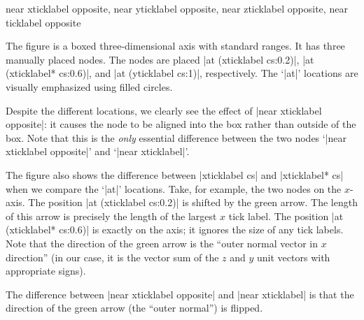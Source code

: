 \begin{anchorlist}{%
    near xticklabel opposite,
    near yticklabel opposite,
    near zticklabel opposite,
    near ticklabel opposite%
}
\begin{codeexample}[width=4cm]
\end{codeexample}
    The figure is a boxed three-dimensional axis with standard ranges. It has
    three manually placed nodes. The nodes are placed |at (xticklabel cs:0.2)|,
    |at (xticklabel* cs:0.6)|, and |at (yticklabel cs:1)|,  respectively. The
    `|at|' locations are visually emphasized using filled circles.

    Despite the different locations, we clearly see the effect of
    |near xticklabel opposite|: it causes the node to be aligned into the box
    rather than outside of the box. Note that this is the \emph{only} essential
    difference between the two nodes `|near xticklabel opposite|' and
    `|near xticklabel|'.

    The figure also shows the difference between |xticklabel cs| and
    |xticklabel* cs| when we compare the `|at|' locations. Take, for example,
    the two nodes on the $x$-axis. The position |at (xticklabel cs:0.2)| is
    shifted by the green arrow. The length of this arrow is precisely the
    length of the largest $x$ tick label. The position
    |at (xticklabel* cs:0.6)| is exactly on the axis; it ignores the size of
    any tick labels. Note that the direction of the green arrow is the ``outer
    normal vector in $x$ direction'' (in our case, it is the vector sum of the
    $z$ and $y$ unit vectors with appropriate signs).

    The difference between |near xticklabel opposite| and |near xticklabel| is
    that the direction of the green arrow (the ``outer normal'') is flipped.


\end{anchorlist}
